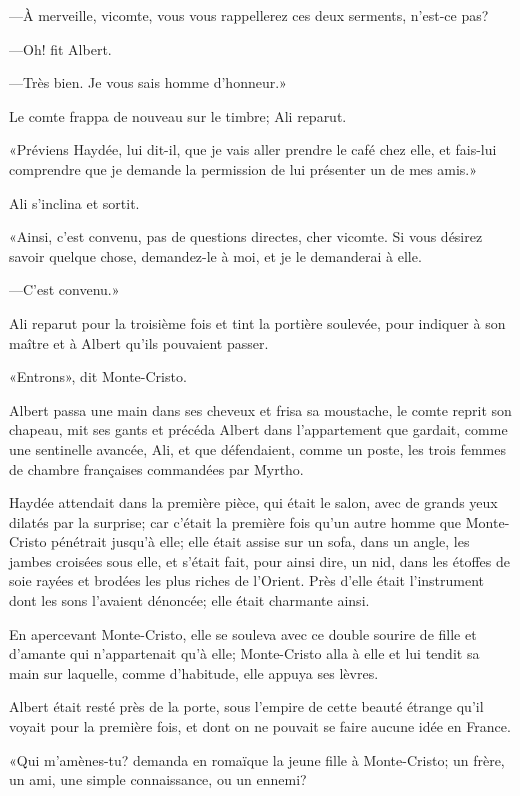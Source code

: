 —À merveille, vicomte, vous vous rappellerez ces deux serments, n'est-ce pas? 

—Oh! fit Albert. 

—Très bien. Je vous sais homme d'honneur.» 

Le comte frappa de nouveau sur le timbre; Ali reparut. 

«Préviens Haydée, lui dit-il, que je vais aller prendre le café chez elle, et fais-lui comprendre que je demande la permission de lui présenter un de mes amis.» 

Ali s'inclina et sortit. 

«Ainsi, c'est convenu, pas de questions directes, cher vicomte. Si vous désirez savoir quelque chose, demandez-le à moi, et je le demanderai à elle. 

—C'est convenu.»  

Ali reparut pour la troisième fois et tint la portière soulevée, pour indiquer à son maître et à Albert qu'ils pouvaient passer. 

«Entrons», dit Monte-Cristo. 

Albert passa une main dans ses cheveux et frisa sa moustache, le comte reprit son chapeau, mit ses gants et précéda Albert dans l'appartement que gardait, comme une sentinelle avancée, Ali, et que défendaient, comme un poste, les trois femmes de chambre françaises commandées par Myrtho. 

Haydée attendait dans la première pièce, qui était le salon, avec de grands yeux dilatés par la surprise; car c'était la première fois qu'un autre homme que Monte-Cristo pénétrait jusqu'à elle; elle était assise sur un sofa, dans un angle, les jambes croisées sous elle, et s'était fait, pour ainsi dire, un nid, dans les étoffes de soie rayées et brodées les plus riches de l'Orient. Près d'elle était l'instrument dont les sons l'avaient dénoncée; elle était charmante ainsi. 

En apercevant Monte-Cristo, elle se souleva avec ce double sourire de fille et d'amante qui n'appartenait qu'à elle; Monte-Cristo alla à elle et lui tendit sa main sur laquelle, comme d'habitude, elle appuya ses lèvres. 

Albert était resté près de la porte, sous l'empire de cette beauté étrange qu'il voyait pour la première fois, et dont on ne pouvait se faire aucune idée en France. 

«Qui m'amènes-tu? demanda en romaïque la jeune fille à Monte-Cristo; un frère, un ami, une simple connaissance, ou un ennemi? 


